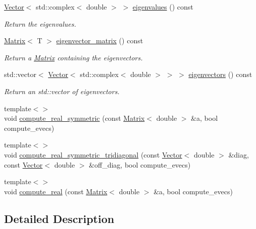 \begin{DoxyCompactItemize}
\hyperlink{classLuna_1_1Vector}{Vector}$<$ std\+::complex$<$ double $>$ $>$ \hyperlink{classLuna_1_1LinearEigensystem_ad74f60a4830eefb2858ab92765dc0ae4}{eigenvalues} () const
\begin{DoxyCompactList}\small\item\em Return the eigenvalues. \end{DoxyCompactList}\item 
\hyperlink{classLuna_1_1Matrix}{Matrix}$<$ T $>$ \hyperlink{classLuna_1_1LinearEigensystem_ab68a36f7f1c1ecf9da83df84be6e49e9}{eigenvector\+\_\+matrix} () const
\begin{DoxyCompactList}\small\item\em Return a \hyperlink{classLuna_1_1Matrix}{Matrix} containing the eigenvectors. \end{DoxyCompactList}\item 
std\+::vector$<$ \hyperlink{classLuna_1_1Vector}{Vector}$<$ std\+::complex$<$ double $>$ $>$ $>$ \hyperlink{classLuna_1_1LinearEigensystem_a34fd0e8eef6dc0e85a13d1cb78beb32f}{eigenvectors} () const
\begin{DoxyCompactList}\small\item\em Return an std\+::vector of eigenvectors. \end{DoxyCompactList}\item 
{\footnotesize template$<$$>$ }\\void \hyperlink{classLuna_1_1LinearEigensystem_a239e3ff62330c51c94d0112de0318249}{compute\+\_\+real\+\_\+symmetric} (const \hyperlink{classLuna_1_1Matrix}{Matrix}$<$ double $>$ \&a, bool compute\+\_\+evecs)
\item 
{\footnotesize template$<$$>$ }\\void \hyperlink{classLuna_1_1LinearEigensystem_a080e0fe1d3baa1f6c5b56b9ae8082ae6}{compute\+\_\+real\+\_\+symmetric\+\_\+tridiagonal} (const \hyperlink{classLuna_1_1Vector}{Vector}$<$ double $>$ \&diag, const \hyperlink{classLuna_1_1Vector}{Vector}$<$ double $>$ \&off\+\_\+diag, bool compute\+\_\+evecs)
\item 
{\footnotesize template$<$$>$ }\\void \hyperlink{classLuna_1_1LinearEigensystem_a0aa01a39e1b44cc2cf225c8566d6bd95}{compute\+\_\+real} (const \hyperlink{classLuna_1_1Matrix}{Matrix}$<$ double $>$ \&a, bool compute\+\_\+evecs)
\end{DoxyCompactItemize}


\subsection{Detailed Description}

